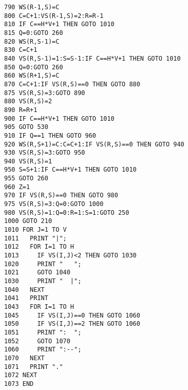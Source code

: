 \begin{lstlisting}
790 WS(R-1,S)=C
800 C=C+1:VS(R-1,S)=2:R=R-1
810 IF C==H*V+1 THEN GOTO 1010
815 Q=0:GOTO 260
820 WS(R,S-1)=C
830 C=C+1
840 VS(R,S-1)=1:S=S-1:IF C==H*V+1 THEN GOTO 1010
850 Q=0:GOTO 260
860 WS(R+1,S)=C
870 C=C+1:IF VS(R,S)==0 THEN GOTO 880
875 VS(R,S)=3:GOTO 890
880 VS(R,S)=2
890 R=R+1
900 IF C==H*V+1 THEN GOTO 1010
905 GOTO 530
910 IF Q==1 THEN GOTO 960
920 WS(R,S+1)=C:C=C+1:IF VS(R,S)==0 THEN GOTO 940
930 VS(R,S)=3:GOTO 950
940 VS(R,S)=1
950 S=S+1:IF C==H*V+1 THEN GOTO 1010
955 GOTO 260
960 Z=1
970 IF VS(R,S)==0 THEN GOTO 980
975 VS(R,S)=3:Q=0:GOTO 1000
980 VS(R,S)=1:Q=0:R=1:S=1:GOTO 250
1000 GOTO 210
1010 FOR J=1 TO V
1011   PRINT "|";
1012   FOR I=1 TO H
1013     IF VS(I,J)<2 THEN GOTO 1030
1020     PRINT "   ";
1021     GOTO 1040
1030     PRINT "  |";
1040   NEXT
1041   PRINT
1043   FOR I=1 TO H
1045     IF VS(I,J)==0 THEN GOTO 1060
1050     IF VS(I,J)==2 THEN GOTO 1060
1051     PRINT ":  ";
1052     GOTO 1070
1060     PRINT ":--";
1070   NEXT
1071   PRINT "."
1072 NEXT
1073 END
\end{lstlisting}
